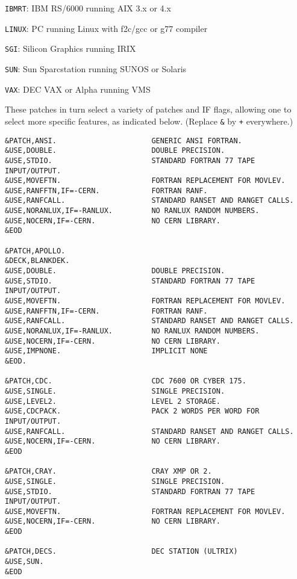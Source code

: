       \verb|IBMRT|: IBM RS/6000 running AIX 3.x or 4.x

      \verb|LINUX|: PC running Linux with f2c/gcc or g77 compiler

      \verb|SGI|: Silicon Graphics running IRIX

      \verb|SUN|: Sun Sparcstation running SUNOS or Solaris

      \verb|VAX|: DEC VAX or Alpha running VMS

\noindent These patches in turn select a variety of patches and IF
flags, allowing one to select more specific features, as indicated
below. (Replace \verb|&| by \verb|+| everywhere.)
\begin{verbatim}
&PATCH,ANSI.                      GENERIC ANSI FORTRAN.
&USE,DOUBLE.                      DOUBLE PRECISION.
&USE,STDIO.                       STANDARD FORTRAN 77 TAPE INPUT/OUTPUT.
&USE,MOVEFTN.                     FORTRAN REPLACEMENT FOR MOVLEV.
&USE,RANFFTN,IF=-CERN.            FORTRAN RANF.
&USE,RANFCALL.                    STANDARD RANSET AND RANGET CALLS.
&USE,NORANLUX,IF=-RANLUX.         NO RANLUX RANDOM NUMBERS.
&USE,NOCERN,IF=-CERN.             NO CERN LIBRARY.
&EOD

&PATCH,APOLLO.
&DECK,BLANKDEK.
&USE,DOUBLE.                      DOUBLE PRECISION.
&USE,STDIO.                       STANDARD FORTRAN 77 TAPE INPUT/OUTPUT.
&USE,MOVEFTN.                     FORTRAN REPLACEMENT FOR MOVLEV.
&USE,RANFFTN,IF=-CERN.            FORTRAN RANF.
&USE,RANFCALL.                    STANDARD RANSET AND RANGET CALLS.
&USE,NORANLUX,IF=-RANLUX.         NO RANLUX RANDOM NUMBERS.
&USE,NOCERN,IF=-CERN.             NO CERN LIBRARY.
&USE,IMPNONE.                     IMPLICIT NONE
&EOD.

&PATCH,CDC.                       CDC 7600 OR CYBER 175.
&USE,SINGLE.                      SINGLE PRECISION.
&USE,LEVEL2.                      LEVEL 2 STORAGE.
&USE,CDCPACK.                     PACK 2 WORDS PER WORD FOR INPUT/OUTPUT.
&USE,RANFCALL.                    STANDARD RANSET AND RANGET CALLS.
&USE,NOCERN,IF=-CERN.             NO CERN LIBRARY.
&EOD

&PATCH,CRAY.                      CRAY XMP OR 2.
&USE,SINGLE.                      SINGLE PRECISION.
&USE,STDIO.                       STANDARD FORTRAN 77 TAPE INPUT/OUTPUT.
&USE,MOVEFTN.                     FORTRAN REPLACEMENT FOR MOVLEV.
&USE,NOCERN,IF=-CERN.             NO CERN LIBRARY.
&EOD

&PATCH,DECS.                      DEC STATION (ULTRIX)
&USE,SUN.
&EOD


\end{verbatim}

